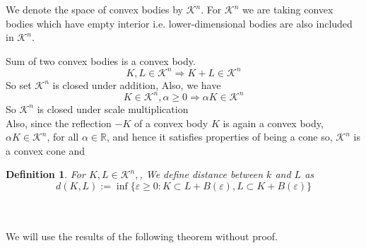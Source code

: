 \documentclass[oneside]{book}
\newtheorem{mydef}{Definition}
\begin{document}
     
 
 
 
 
 
 
 
 
 We denote the space of convex bodies by  $\mathcal{K}^{n}$. For  $\mathcal{K}^{n}$  we are taking convex bodies which have empty interior i.e. lower-dimensional bodies are also included in $\mathcal{K}^{n}$. 

 Sum of two convex bodies is a convex body. \\
 $$
   K, L \in \mathcal{K}^{n} \Longrightarrow K+L \in \mathcal{K}^{n}
$$ 
 So  set $\mathcal{K}^{n}$ is closed under addition,
 Also, we have
 $$ 
K \in \mathcal{K}^{n}, \alpha \geq 0 \Longrightarrow \alpha K \in \mathcal{K}^{n}
$$
So  $\mathcal{K}^{n}$ is closed under scale multiplication \\

Also, since the reflection $-K$ of a convex body $K$ is again a convex body, $\alpha K \in \mathcal{K}^{n}$, for all $\alpha \in \mathbb{R}$, and hence it satisfies properties of being a cone so,  $\mathcal{K}^{n}$ is a convex cone and 






\begin{mydef}    

For  $ K, L \in \mathcal{K}^{n}, $, We define distance between $k$ and $L$ as 
\begin{equation}
d(K, L):=\inf \{\varepsilon \geq 0: K \subset L+B(\varepsilon), L \subset K+B(\varepsilon)\}
\end{equation}
\end{mydef}
\quad 
\\\\
We will use the results of the following theorem without proof. 
\end{document}
